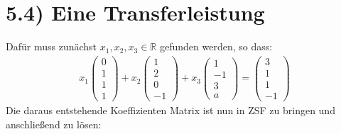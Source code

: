 \documentclass[titlepage]{article}
\begin{document}
	\section*{5.4) Eine Transferleistung}
	Dafür muss zunächst $x_1,x_2,x_3\in\mathbb{R}$ gefunden werden, so dass:
	\begin{align*}
		x_1\begin{pmatrix}
			0\\1\\1\\1
		\end{pmatrix}+
		x_2\begin{pmatrix}
			1\\2\\0\\-1
		\end{pmatrix}+
		x_3\begin{pmatrix}
			1\\-1\\3\\a
		\end{pmatrix}=
		\begin{pmatrix}
			3\\1\\1\\-1
		\end{pmatrix}
	\end{align*}
	Die daraus entstehende Koeffizienten Matrix ist nun in ZSF zu bringen und anschließend zu lösen:
\end{document}

